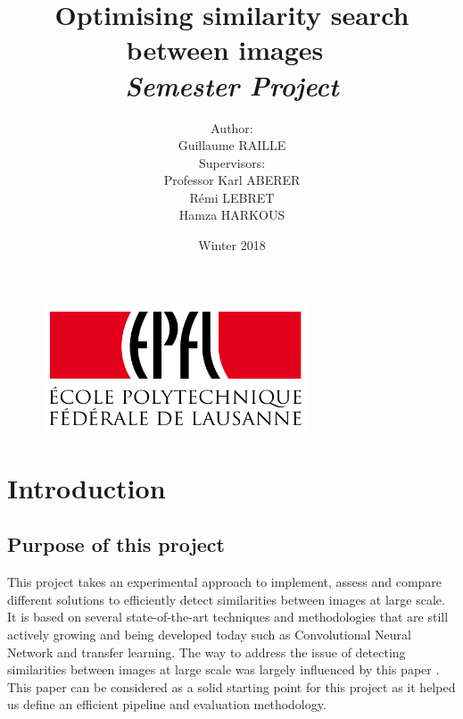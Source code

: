 \documentclass[a4paper]{article}
\begin{document}
\title{\textbf{\huge Optimising similarity search between images}\  \\  \textit{Semester Project}\vspace{3 cm}}

\author{Author:\\ Guillaume RAILLE \vspace{1 cm}\\ Supervisors: \\ Professor Karl ABERER \\ Rémi LEBRET \\ Hamza HARKOUS  \vspace{3 cm}}



\date{Winter 2018}


\begin{figure}
\centering
\includegraphics[width=0.7\textwidth]{epfl}
\end{figure}
\renewcommand{\headrulewidth}{1pt}

\maketitle
\pagestyle{fancy}

\newpage
\section*{Introduction}
	\subsection*{Purpose of this project}
	This project takes an experimental approach to implement, assess and compare different solutions to efficiently detect similarities between images at large scale. It is based on several state-of-the-art techniques and methodologies that are still actively growing and being developed today such as Convolutional Neural Network and transfer learning. The way to address the issue of detecting similarities between images at large scale was largely influenced by this paper \cite{large-scale-search}. This paper can be considered as a solid starting point for this project as it helped us define an efficient pipeline and evaluation methodology.
	
\end{document}

